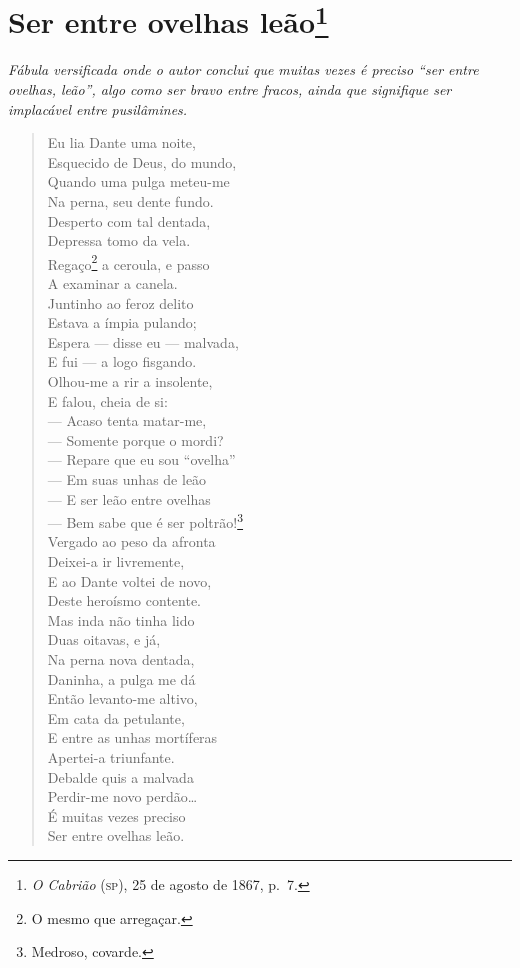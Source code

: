 \chapter{Ser entre ovelhas leão\footnote{
\emph{O Cabrião} (\textsc{sp}), 25 de agosto de 1867, p.~7.}}

\begin{didascalia}
\emph{Fábula versificada onde o autor conclui que muitas vezes é preciso
``ser entre ovelhas, leão'', algo como ser bravo entre fracos, ainda que
signifique ser implacável entre pusilâmines.}
\end{didascalia}


\begin{verse}
Eu lia Dante uma noite,\\
Esquecido de Deus, do mundo,\\
Quando uma pulga meteu-me\\
Na perna, seu dente fundo.\\
Desperto com tal dentada,\\
Depressa tomo da vela.\\
Regaço\footnote{ O mesmo que arregaçar.} a ceroula, e passo\\
A examinar a canela.\\
Juntinho ao feroz delito\\
Estava a ímpia pulando;\\
Espera --- disse eu --- malvada,\\
E fui --- a logo fisgando.\\
Olhou-me a rir a insolente,\\
E falou, cheia de si:\\
--- Acaso tenta matar-me,\\
--- Somente porque o mordi?\\
--- Repare que eu sou ``ovelha''\\
--- Em suas unhas de leão\\
--- E ser leão entre ovelhas\\
--- Bem sabe que é ser poltrão!\footnote{ Medroso, covarde.}\\
Vergado ao peso da afronta\\
Deixei-a ir livremente,\\
E ao Dante voltei de novo,\\
Deste heroísmo contente.\\
Mas inda não tinha lido\\
Duas oitavas, e já,\\
Na perna nova dentada,\\
Daninha, a pulga me dá\\
Então levanto-me altivo,\\
Em cata da petulante,\\
E entre as unhas mortíferas\\
Apertei-a triunfante.\\
Debalde quis a malvada\\
Perdir-me novo perdão\ldots{}\\ %
É muitas vezes preciso\\
Ser entre ovelhas leão.
\end{verse}

